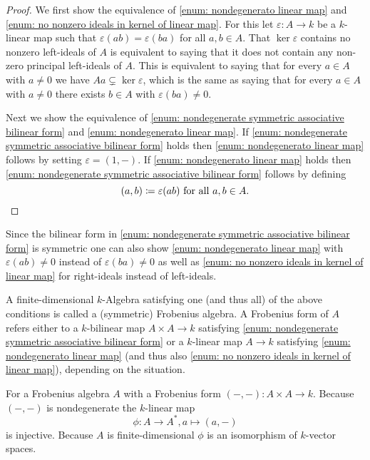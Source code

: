 \begin{proof}
 We first show the equivalence of \ref{enum: nondegenerato linear map} and \ref{enum: no nonzero ideals in kernel of linear map}. For this let $\varepsilon \colon A \to k$ be a $k$-linear map such that $\varepsilon(ab) = \varepsilon(ba)$ for all $a,b \in A$. That $\ker \varepsilon$ contains no nonzero left-ideals of $A$ is equivalent to saying that it does not contain any non-zero principal left-ideals of $A$. This is equivalent to saying that for every $a \in A$ with $a \neq 0$ we have $Aa \subsetneq \ker \varepsilon$, which is the same as saying that for every $a \in A$ with $a \neq 0$ there exists $b \in A$ with $\varepsilon(ba) \neq 0$.
 
 Next we show the equivalence of \ref{enum: nondegenerate symmetric associative bilinear form} and \ref{enum: nondegenerato linear map}. If \ref{enum: nondegenerate symmetric associative bilinear form} holds then \ref{enum: nondegenerato linear map} follows by setting $\varepsilon = (1,-)$. If \ref{enum: nondegenerato linear map} holds then \ref{enum: nondegenerate symmetric associative bilinear form} follows by defining
 \[
  (a,b) \coloneqq \varepsilon(ab) \text{ for all } a,b \in A.
  \qedhere
 \]
\end{proof}


\begin{rem}
 Since the bilinear form in \ref{enum: nondegenerate symmetric associative bilinear form} is symmetric one can also show \ref{enum: nondegenerato linear map} with $\varepsilon(ab) \neq 0$ instead of $\varepsilon(ba) \neq 0$ as well as \ref{enum: no nonzero ideals in kernel of linear map} for right-ideals instead of left-ideals.
\end{rem}


\begin{defi}
 A finite-dimensional $k$-Algebra satisfying one (and thus all) of the above conditions is called a (symmetric) Frobenius algebra. A Frobenius form of $A$ refers either to a $k$-bilinear map $A \times A \to k$ satisfying \ref{enum: nondegenerate symmetric associative bilinear form} or a $k$-linear map $A \to k$ satisfying \ref{enum: nondegenerato linear map} (and thus also \ref{enum: no nonzero ideals in kernel of linear map}), depending on the situation.
\end{defi}


\begin{rem}
 For a Frobenius algebra $A$ with a Frobenius form $(-,-) \colon A \times A \to k$. Because $(-,-)$ is nondegenerate the $k$-linear map
 \[
  \phi \colon A \to A^*, a \mapsto (a,-)
 \]
 is injective. Because $A$ is finite-dimensional $\phi$ is an isomorphism of $k$-vector spaces.
\end{rem}


